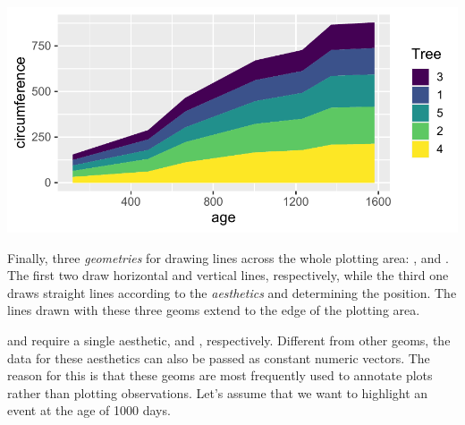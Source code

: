 \documentclass[krantz2]{krantz}\usepackage{knitr}
\begin{document}
\begin{knitrout}\footnotesize
{}\color{fgcolor}\begin{kframe}
\begin{alltt}
\hlstd{(} 
       \hlstd{(}      \hlopt{+}
  \hlstd{(} \hlstd{=} \hlstd{)}
\end{alltt}
\end{kframe}

{\centering \includegraphics[width=.7\textwidth]{figure/pos-area-plot-01-1}

}



\end{knitrout}

Finally,\label{sec:plot:vhline} three \emph{geometries} for drawing lines across the whole plotting area: ,  and . The first two draw horizontal and vertical lines, respectively, while the third one draws straight lines according to the \emph{aesthetics}  and  determining the position. The lines drawn with these three geoms extend to the edge of the plotting area.

 and  require a single aesthetic,  and , respectively. Different from other geoms, the data for these aesthetics can also be passed as constant numeric vectors. The reason for this is that these geoms are most frequently used to annotate plots rather than plotting observations. Let's assume that we want to highlight an event at the age of 1000 days.
\end{document}
